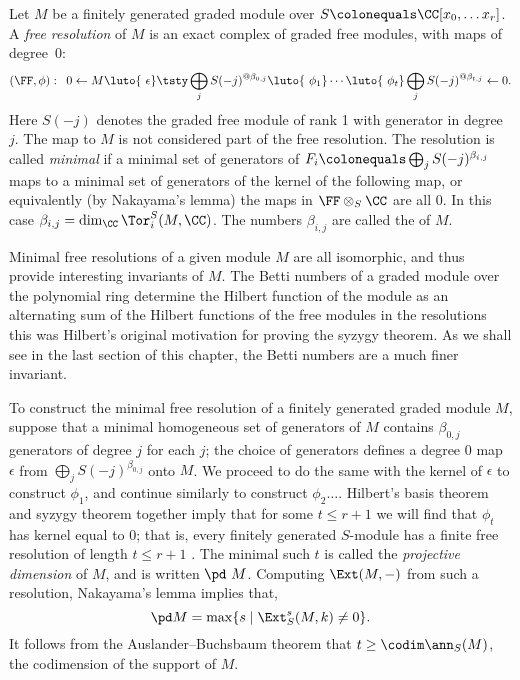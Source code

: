 Let $M$ be a finitely generated graded module over $S \colonequals
\CC[x_0, \dots x_r]$. A \emph{free resolution} of $M$ is an
%
exact complex
%
of graded free modules, with maps of degree~0:
$$
\let\quad\enspace
(\FF, \phi):\quad 0\leftarrow M \luto{\ \epsilon}
\tsty\bigoplus_jS(-j)^{@\beta_{0,j}}
\luto{\ \phi_1}\cdots
\luto{\ \phi_t}\bigoplus_jS(-j)^{@\beta_{t,j}}\leftarrow 0.
$$
Here $S(-j)$ denotes the graded free module of rank 1 with generator in
degree~$j$.
The map to $M$ is not considered part of the free resolution. The
resolution is called \emph{minimal} if a minimal set of generators of $F_i
\index{minimal free resolution}%
\index{free resolution!minimal}%
\colonequals  \bigoplus_jS(-j)^{\beta_{i,j}}$ maps to a minimal set of
generators of the kernel of the following map,
or equivalently (by Nakayama's lemma) the maps in $\FF\otimes_S \CC$
%
are all 0. In this case $\beta_{i,j} = \dim_{\CC}\Tor_{i}^{S}(M, \CC)$. 
%
The numbers $\beta_{i,j}$ are called the 
%
of $M$. 

Minimal free resolutions of a given module $M$ are all isomorphic, and thus provide
interesting invariants of $M$.
The Betti numbers of a graded module over the polynomial ring determine
the Hilbert function of the module as an alternating sum of the Hilbert functions of
the free modules in the resolutions \emdash this was Hilbert's original motivation
for proving the  syzygy  theorem. As we shall see in the last section of this chapter,
%
%
%
%
the Betti numbers are a much finer invariant.


To construct the minimal free resolution of a finitely generated graded module $M$, suppose that a minimal homogeneous set of generators
of $M$
contains $\beta_{0,j}$ generators of degree $j$ for each $j$; the choice of generators
defines a degree 0 map $\epsilon$
from
$
\bigoplus_jS(-j)^{\beta_{0,j}}
$
onto $M$. We proceed to do the same with the kernel of $\epsilon$ to construct $\phi_{1}$, and continue similarly to construct $\phi_{2}\dots$.
Hilbert's basis theorem
%
and
syzygy theorem
%
together imply that 
for some $t\leq r+1$ we will find that $\phi_t$ has
kernel equal to 0; that is,
every finitely
generated $S$-module has a finite free resolution
of length $t\leq r+1$
\cite[Corollary 19.7]{Eisenbud1995}.
The minimal such $t$ is called the \emph{projective dimension} of $M$,
and is written $\pd\ M$.
%
%
Computing $\Ext(M,-)$ from such a resolution, Nakayama's lemma implies that,
$$
\pd M = \max\{s \mid \Ext_S^s(M,k) \neq 0 \}.
$$
It follows from the Auslander--Buchsbaum
%
theorem \cite[Theorem 19.9]{Eisenbud1995} that $t \geq \codim \ann_S(M)$,
the codimension of the support of $M$.

